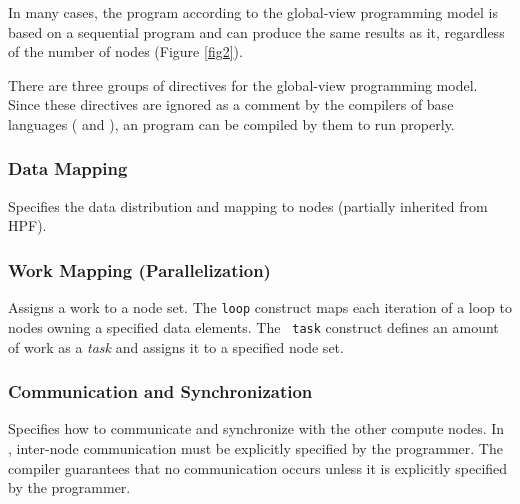 In many cases, the {\XMP} program according to the global-view
programming model is based on a sequential program and can produce the
same results as it, regardless of the number of nodes (Figure
\ref{fig2}).

There are three groups of directives for the global-view programming
model. Since these directives are ignored as a comment by the
compilers of base languages ({\Fort} and {\C}), an {\XMP} program can be
compiled by them to run properly.


\subsubsection*{Data Mapping}

Specifies the data distribution and mapping to nodes (partially
inherited from HPF).

\subsubsection*{Work Mapping (Parallelization)}

Assigns a work to a node set. The {\tt loop} construct maps each
iteration of a loop to nodes owning a specified data elements. The {\tt
task} construct defines an amount of work as a {\it task} and assigns it
to a specified node set.

\subsubsection*{Communication and Synchronization}

Specifies how to communicate and synchronize with the other compute
nodes. In {\XMP}, inter-node communication must be explicitly specified
by the programmer. The compiler guarantees that no communication occurs
unless it is explicitly specified by the programmer.

